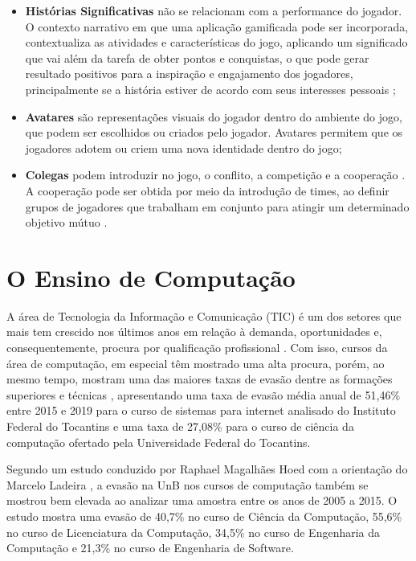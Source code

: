 \begin{itemize}
    \item \textbf{Histórias Significativas} não se relacionam com a performance do jogador. O contexto narrativo em que uma aplicação gamificada pode ser incorporada, contextualiza as atividades e características do jogo, aplicando um significado que vai além da tarefa de obter pontos e conquistas, o que pode gerar resultado positivos para a inspiração e engajamento dos jogadores, principalmente se a história estiver de acordo com seus interesses pessoais \cite{meaningful-gamification};
    \item \textbf{Avatares} são representações visuais do jogador dentro do ambiente do jogo, que podem ser escolhidos ou criados pelo jogador. Avatares permitem que os jogadores adotem ou criem uma nova identidade dentro do jogo;
    \item \textbf{Colegas} podem introduzir no jogo, o conflito, a competição e a cooperação \cite{kapp_gamification}. A cooperação pode ser obtida por meio da introdução de times, ao definir grupos de jogadores que trabalham em conjunto para atingir um determinado objetivo mútuo \cite{ranking_motivation}.
\end{itemize}

\section{O Ensino de Computação}

A área de Tecnologia da Informação e Comunicação (TIC) é um dos setores que mais tem crescido nos últimos anos em relação à demanda, oportunidades e, consequentemente, procura por qualificação profissional \cite{brasscom-tic}. Com isso, cursos da área de computação, em especial têm mostrado uma alta procura, porém, ao mesmo tempo, mostram uma das maiores taxas de evasão dentre as formações superiores e técnicas \cite{evasao-computacao}, apresentando uma taxa de evasão média anual de 51,46\% entre 2015 e 2019 para o curso de sistemas para internet analisado do Instituto Federal do Tocantins e uma taxa de 27,08\% para o curso de ciência da computação ofertado pela Universidade Federal do Tocantins.

Segundo um estudo conduzido por Raphael Magalhães Hoed com a orientação do \prof \dr Marcelo Ladeira \cite{evasao-unb}, a evasão na UnB nos cursos de computação também se mostrou bem elevada ao analizar uma amostra entre os anos de 2005 a 2015. O estudo mostra uma evasão de 40,7\% no curso de Ciência da Computação, 55,6\% no curso de Licenciatura da Computação, 34,5\% no curso de Engenharia da Computação e 21,3\% no curso de Engenharia de Software.

